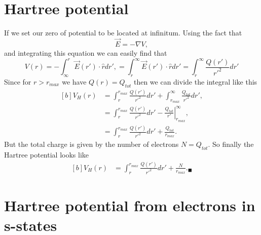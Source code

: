\documentclass[12pt]{article}
\begin{document}
\section{Hartree potential}
If we set our zero of potential to be located at infinitum. Using the fact that
\begin{equation}
    \vec{E} = -\nabla V,
\end{equation}
and integrating this equation we can easily find that 
\begin{equation}
    V(r) = - \int_{\infty}^r \vec{E}(r')\cdot \hat{r} dr', = \int^{\infty}_r \vec{E}(r')\cdot \hat{r} dr' =  \int^{\infty}_r \frac{Q(r')}{r'^2}dr'
\end{equation}
Since for $r>r_{max}$ we have $Q(r)= Q_{tot}$ then we can divide the integral like this 
\begin{equation}
    \begin{aligned}[b]
     V_H(r) &=  \int^{r_{max}}_r \frac{Q(r')}{r'^2}dr' + \int^{\infty}_{r_{max}} \frac{Q_{tot}}{r'^2}dr',\\
     &=  \int^{r_{max}}_r \frac{Q(r')}{r'^2}dr' -  \left.\frac{Q_{tot}}{r'}\right|^\infty_{r_{max}},\\
     &=  \int^{r_{max}}_r \frac{Q(r')}{r'^2}dr' + \frac{Q_{tot}}{r_{max}}.
     \end{aligned}
\end{equation}
But the total charge is given by the number of electrons $N=Q_{tot}$. So finally the Hartree potential looks like
\begin{equation}
    \begin{aligned}[b]
     V_H(r) &=  \int^{r_{max}}_r \frac{Q(r')}{r'^2}dr' + \frac{N}{r_{max}}. _\blacksquare
     \end{aligned}
\end{equation}
\section{Hartree potential from electrons in s-states}
\end{document}

